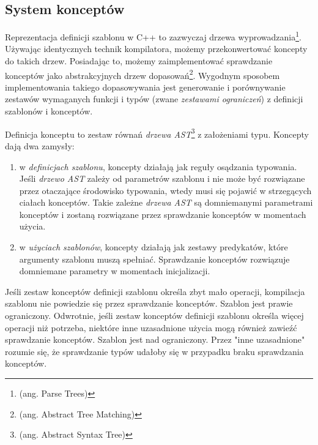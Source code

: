 \documentclass[11pt, a4paper]{article}
\begin{document}
\lstset{language=C++}

\subsection{System konceptów}

Reprezentacja definicji szablonu w C++ to zazwyczaj drzewa wyprowadzania\footnote{(ang. Parse Trees)}. Używając identycznych technik kompilatora, możemy przekonwertować koncepty do takich drzew. Posiadając to, możemy zaimplementować sprawdzanie konceptów jako abstrakcyjnych drzew dopasowań\footnote{(ang. Abstract Tree Matching)}. Wygodnym sposobem implementowania takiego dopasowywania jest generowanie i porównywanie zestawów wymaganych funkcji i typów (zwane \emph{zestawami ograniczeń}) z definicji szablonów i konceptów.

Definicja konceptu to zestaw równań \emph{drzewa AST}\footnote{(ang. Abstract Syntax Tree)} z założeniami typu. Koncepty dają dwa zamysły:

\begin{enumerate}

\item w \emph{definicjach szablonu}, koncepty działają jak reguły osądzania typowania. Jeśli \emph{drzewo AST} zależy od parametrów szablonu i nie może być rozwiązane przez otaczające środowisko typowania, wtedy musi się pojawić w strzegących ciałach konceptów. Takie zależne \emph{drzewa AST} są domniemanymi parametrami konceptów i zostaną rozwiązane przez sprawdzanie konceptów w momentach użycia.

\item w \emph{użyciach szablonów}, koncepty działają jak zestawy predykatów, które argumenty szablonu muszą spełniać. Sprawdzanie konceptów rozwiązuje domniemane parametry w momentach inicjalizacji.

\end{enumerate}

Jeśli zestaw konceptów definicji szablonu określa zbyt mało operacji, kompilacja szablonu nie powiedzie się przez sprawdzanie konceptów. Szablon jest prawie ograniczony. Odwrotnie, jeśli zestaw konceptów definicji szablonu określa więcej operacji niż potrzeba, niektóre inne uzasadnione użycia mogą również zawieźć sprawdzanie konceptów. Szablon jest nad ograniczony. Przez "inne uzasadnione" rozumie się, że sprawdzanie typów udałoby się w przypadku braku sprawdzania konceptów.
\end{document}
